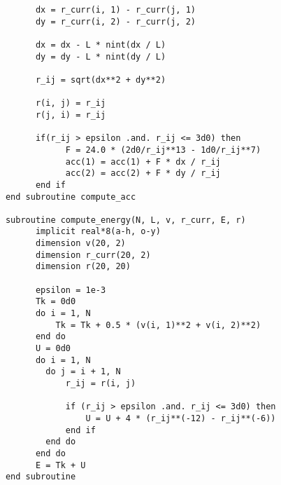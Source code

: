 \begin{verbatim}
            dx = r_curr(i, 1) - r_curr(j, 1)
            dy = r_curr(i, 2) - r_curr(j, 2)

            dx = dx - L * nint(dx / L)
            dy = dy - L * nint(dy / L)

            r_ij = sqrt(dx**2 + dy**2)
            
            r(i, j) = r_ij 
            r(j, i) = r_ij

            if(r_ij > epsilon .and. r_ij <= 3d0) then 
                  F = 24.0 * (2d0/r_ij**13 - 1d0/r_ij**7)
                  acc(1) = acc(1) + F * dx / r_ij 
                  acc(2) = acc(2) + F * dy / r_ij
            end if 
      end subroutine compute_acc

      subroutine compute_energy(N, L, v, r_curr, E, r)
            implicit real*8(a-h, o-y)
            dimension v(20, 2)
            dimension r_curr(20, 2)
            dimension r(20, 20)
            
            epsilon = 1e-3
            Tk = 0d0
            do i = 1, N
                Tk = Tk + 0.5 * (v(i, 1)**2 + v(i, 2)**2)
            end do
            U = 0d0
            do i = 1, N
              do j = i + 1, N
                  r_ij = r(i, j)

                  if (r_ij > epsilon .and. r_ij <= 3d0) then
                      U = U + 4 * (r_ij**(-12) - r_ij**(-6))
                  end if
              end do
            end do
            E = Tk + U
      end subroutine
\end{verbatim}